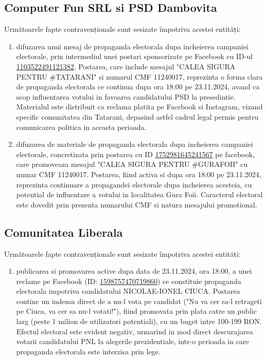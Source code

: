 \documentclass[a4paper,12pt]{article}
\begin{document}
\vspace{0.5cm}

\subsection{Computer Fun SRL si PSD Dambovita}
Următoarele fapte contravenționale sunt sesizate împotriva acestei entități:

\begin{enumerate}[leftmargin=*, label=\arabic*.)]
    \item difuzarea unui mesaj de propaganda electorala dupa incheierea campaniei electorale, prin intermediul unei postari sponsorizate pe Facebook cu ID-ul \href{https://www.facebook.com/ads/library/?id=1103522491121382}{1103522491121382}. Postarea, care include mesajul "CALEA SIGURA PENTRU \#TATARANI" si numarul CMF 11240017, reprezinta o forma clara de propaganda electorala ce continua dupa ora 18:00 pe 23.11.2024, avand ca scop influentarea votului in favoarea candidatului PSD la presedintie. Materialul este distribuit ca reclama platita pe Facebook si Instagram, vizand specific comunitatea din Tatarani, depasind astfel cadrul legal permis pentru comunicarea politica in aceasta perioada.
    \item difuzarea de materiale de propaganda electorala dupa incheierea campaniei electorale, concretizata prin postarea cu ID \href{https://www.facebook.com/ads/library/?id=1752981645241567}{1752981645241567} pe facebook, care promoveaza mesajul "CALEA SIGURA PENTRU \#GURAFOII" cu numar CMF 11240017. Postarea, fiind activa si dupa ora 18:00 pe 23.11.2024, reprezinta continuare a propagandei electorale dupa incheierea acesteia, cu potential de influentare a votului in localitatea Gura Foii. Caracterul electoral este dovedit prin prezenta numarului CMF si natura mesajului promotional.
\end{enumerate}

\vspace{0.5cm}

\subsection{Comunitatea Liberala}
Următoarele fapte contravenționale sunt sesizate împotriva acestei entități:

\begin{enumerate}[leftmargin=*, label=\arabic*.)]
    \item publicarea si promovarea active dupa data de 23.11.2024, ora 18:00, a unei reclame pe Facebook (ID: \href{https://www.facebook.com/ads/library/?id=1598757470719860}{1598757470719860}) ce constituie propaganda electorala impotriva candidatului NICOLAE-IONEL CIUCA. Postarea contine un indemn direct de a nu-l vota pe candidat ("Nu va cer sa-l retrageti pe Ciuca, va cer sa nu-l votati!"), fiind promovata prin plata catre un public larg (peste 1 milion de utilizatori potentiali), cu un buget intre 100-199 RON. Efectul electoral este evident negativ, urmarind in mod direct descurajarea votarii candidatului PNL la alegerile prezidentiale, intr-o perioada in care propaganda electorala este interzisa prin lege.
\end{enumerate}
\end{document}
